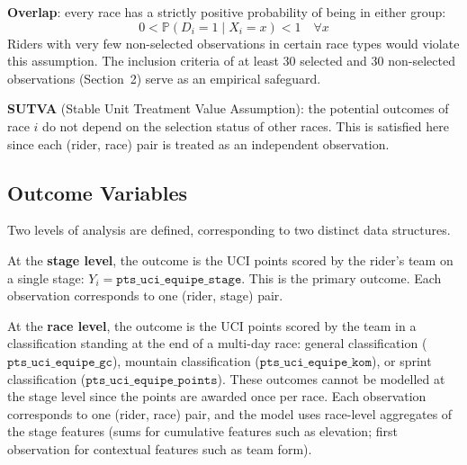 \textbf{Overlap}: every race has a strictly positive probability of being in either group:
\begin{equation}
    0 < \mathbb{P}(D_i = 1 \mid X_i = x) < 1 \quad \forall x
    \label{eq:overlap}
\end{equation}
Riders with very few non-selected observations in certain race types would violate this assumption. The inclusion criteria of at least 30 selected and 30 non-selected observations (Section~2) serve as an empirical safeguard.

\textbf{SUTVA} (Stable Unit Treatment Value Assumption): the potential outcomes of race $i$ do not depend on the selection status of other races. This is satisfied here since each (rider, race) pair is treated as an independent observation.

\subsection{Outcome Variables}

Two levels of analysis are defined, corresponding to two distinct data structures.

At the \textbf{stage level}, the outcome is the UCI points scored by the rider's team on a single stage: $Y_i = \texttt{pts\_uci\_equipe\_stage}$. This is the primary outcome. Each observation corresponds to one (rider, stage) pair.

At the \textbf{race level}, the outcome is the UCI points scored by the team in a classification standing at the end of a multi-day race: general classification ($\texttt{pts\_uci\_equipe\_gc}$), mountain classification ($\texttt{pts\_uci\_equipe\_kom}$), or sprint classification ($\texttt{pts\_uci\_equipe\_points}$). These outcomes cannot be modelled at the stage level since the points are awarded once per race. Each observation corresponds to one (rider, race) pair, and the model uses race-level aggregates of the stage features (sums for cumulative features such as elevation; first observation for contextual features such as team form).
